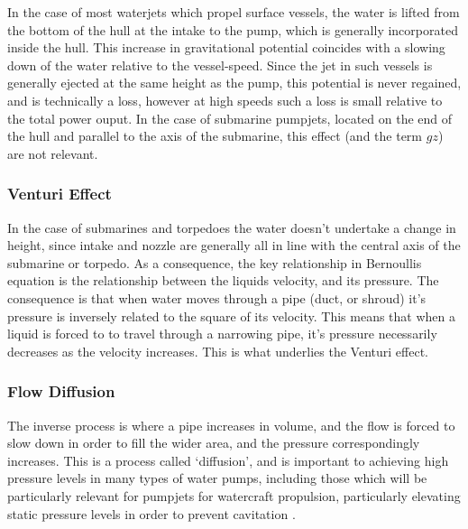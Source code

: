 \documentclass{article}\usepackage[]{graphicx}\usepackage[]{color}
\begin{document}
\begin{appendices}
In the case of most waterjets which propel surface vessels, the water is lifted from the bottom of the hull at the intake to the pump, which is generally incorporated inside the hull. This increase in gravitational potential coincides with a slowing down of the water relative to the vessel-speed. Since the jet in such vessels is generally ejected at the same height as the pump, this potential is never regained, and is technically a loss, however at high speeds such a loss is small relative to the total power ouput.  In the case of submarine pumpjets, located on the end of the hull and parallel to the axis of the submarine, this effect (and the term $gz$) are not relevant.

\subsubsection{Venturi Effect}
In the case of submarines and torpedoes the water doesn't undertake a change in height, since intake and nozzle are generally all in line with the central axis of the submarine or torpedo.  As a consequence, the key relationship in Bernoullis equation is the relationship between the liquids velocity, and its pressure.  The consequence is that when water moves through a pipe (duct, or shroud) it's pressure is inversely related to the square of its velocity.  This means that when a liquid is forced to to travel through a narrowing pipe, it's pressure necessarily decreases as the velocity increases.  This is what underlies the Venturi effect.

\subsubsection{Flow Diffusion}
The inverse process is where a pipe increases in volume, and the flow is forced to slow down in order to fill the wider area, and the pressure correspondingly increases.  This is a process called `diffusion', and is important to achieving high pressure levels in many types of water pumps, including those which will be particularly relevant for pumpjets for watercraft propulsion, particularly elevating static pressure levels in order to prevent cavitation \parencite{hamilton1997, mccormick1963design, bruce1974}.


\end{appendices}
\end{document}
